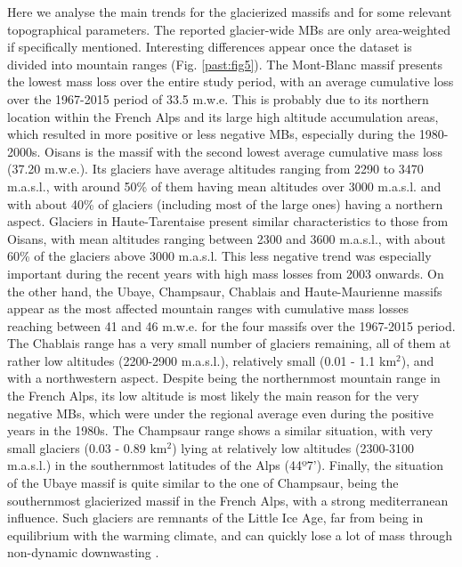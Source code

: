 {Here we analyse the main trends for the glacierized massifs and for some relevant topographical parameters. The reported glacier-wide MBs are only area-weighted if specifically mentioned. Interesting differences appear once the dataset is divided into mountain ranges (Fig. \ref{past:fig5}). The Mont-Blanc massif presents the lowest mass loss over the entire study period, with an average cumulative loss over the 1967-2015 period of 33.5 m.w.e. This is probably due to its northern location within the French Alps and its large high altitude accumulation areas, which resulted in more positive or less negative MBs, especially during the 1980-2000s. Oisans is the massif with the second lowest average cumulative mass loss (37.20 m.w.e.). Its glaciers have average altitudes ranging from 2290 to 3470 m.a.s.l., with around 50\% of them having mean altitudes over 3000 m.a.s.l. and with about 40\% of glaciers (including most of the large ones) having a northern aspect. Glaciers in Haute-Tarentaise present similar characteristics to those from Oisans, with mean altitudes ranging between 2300 and 3600 m.a.s.l., with about 60\% of the glaciers above 3000 m.a.s.l. This less negative trend was especially important during the recent years with high mass losses from 2003 onwards. On the other hand, the Ubaye, Champsaur, Chablais and Haute-Maurienne massifs appear as the most affected mountain ranges with cumulative mass losses reaching between 41 and 46 m.w.e. for the four massifs over the 1967-2015 period. The Chablais range has a very small number of glaciers remaining, all of them at rather low altitudes (2200-2900 m.a.s.l.), relatively small (0.01 - 1.1 km$^{2}$), and with a northwestern aspect. Despite being the northernmost mountain range in the French Alps, its low altitude is most likely the main reason for the very negative MBs, which were under the regional average even during the positive years in the 1980s. The Champsaur range shows a similar situation, with very small glaciers (0.03 - 0.89 km$^{2}$) lying at relatively low altitudes (2300-3100 m.a.s.l.) in the southernmost latitudes of the Alps (44º7’). Finally, the situation of the Ubaye massif is quite similar to the one of Champsaur, being the southernmost glacierized massif in the French Alps, with a strong mediterranean influence. Such glaciers are remnants of the Little Ice Age, far from being in equilibrium with the warming climate, and can quickly lose a lot of mass through non-dynamic downwasting \citep{paul_rapid_2004}.

}
